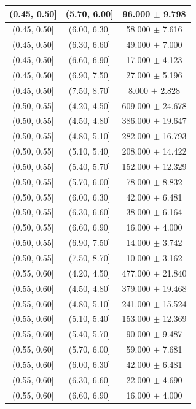 \begin{longtable}{|c|c|c|}
\hline
(0.45, 0.50] & (5.70, 6.00] & 96.000 $\pm$ 9.798 \\ 
\hline
(0.45, 0.50] & (6.00, 6.30] & 58.000 $\pm$ 7.616 \\ 
\hline
(0.45, 0.50] & (6.30, 6.60] & 49.000 $\pm$ 7.000 \\ 
\hline
(0.45, 0.50] & (6.60, 6.90] & 17.000 $\pm$ 4.123 \\ 
\hline
(0.45, 0.50] & (6.90, 7.50] & 27.000 $\pm$ 5.196 \\ 
\hline
(0.45, 0.50] & (7.50, 8.70] & 8.000 $\pm$ 2.828 \\ 
\hline
(0.50, 0.55] & (4.20, 4.50] & 609.000 $\pm$ 24.678 \\ 
\hline
(0.50, 0.55] & (4.50, 4.80] & 386.000 $\pm$ 19.647 \\ 
\hline
(0.50, 0.55] & (4.80, 5.10] & 282.000 $\pm$ 16.793 \\ 
\hline
(0.50, 0.55] & (5.10, 5.40] & 208.000 $\pm$ 14.422 \\ 
\hline
(0.50, 0.55] & (5.40, 5.70] & 152.000 $\pm$ 12.329 \\ 
\hline
(0.50, 0.55] & (5.70, 6.00] & 78.000 $\pm$ 8.832 \\ 
\hline
(0.50, 0.55] & (6.00, 6.30] & 42.000 $\pm$ 6.481 \\ 
\hline
(0.50, 0.55] & (6.30, 6.60] & 38.000 $\pm$ 6.164 \\ 
\hline
(0.50, 0.55] & (6.60, 6.90] & 16.000 $\pm$ 4.000 \\ 
\hline
(0.50, 0.55] & (6.90, 7.50] & 14.000 $\pm$ 3.742 \\ 
\hline
(0.50, 0.55] & (7.50, 8.70] & 10.000 $\pm$ 3.162 \\ 
\hline
(0.55, 0.60] & (4.20, 4.50] & 477.000 $\pm$ 21.840 \\ 
\hline
(0.55, 0.60] & (4.50, 4.80] & 379.000 $\pm$ 19.468 \\ 
\hline
(0.55, 0.60] & (4.80, 5.10] & 241.000 $\pm$ 15.524 \\ 
\hline
(0.55, 0.60] & (5.10, 5.40] & 153.000 $\pm$ 12.369 \\ 
\hline
(0.55, 0.60] & (5.40, 5.70] & 90.000 $\pm$ 9.487 \\ 
\hline
(0.55, 0.60] & (5.70, 6.00] & 59.000 $\pm$ 7.681 \\ 
\hline
(0.55, 0.60] & (6.00, 6.30] & 42.000 $\pm$ 6.481 \\ 
\hline
(0.55, 0.60] & (6.30, 6.60] & 22.000 $\pm$ 4.690 \\ 
\hline
(0.55, 0.60] & (6.60, 6.90] & 16.000 $\pm$ 4.000 \\ 

\end{longtable}
